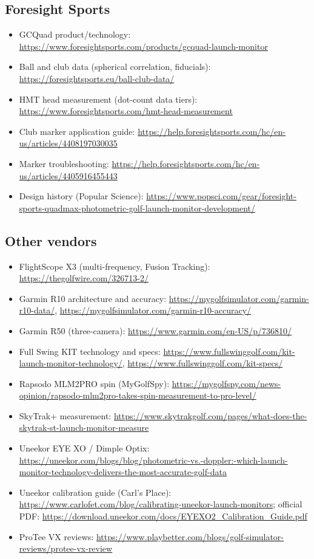 \subsection*{Foresight Sports}
\begin{itemize}\small
\item GCQuad product/technology:
  \url{https://www.foresightsports.com/products/gcquad-launch-monitor}
\item Ball and club data (spherical correlation, fiducials):
  \url{https://foresightsports.eu/ball-club-data/}
\item HMT head measurement (dot-count data tiers):
  \url{https://www.foresightsports.com/hmt-head-measurement}
\item Club marker application guide:
  \url{https://help.foresightsports.com/hc/en-us/articles/4408197030035}
\item Marker troubleshooting:
  \url{https://help.foresightsports.com/hc/en-us/articles/4405916455443}
\item Design history (Popular Science):
  \url{https://www.popsci.com/gear/foresight-sports-quadmax-photometric-golf-launch-monitor-development/}
\end{itemize}

\subsection*{Other vendors}
\begin{itemize}\small
\item FlightScope X3 (multi-frequency, Fusion Tracking):
  \url{https://thegolfwire.com/326713-2/}
\item Garmin R10 architecture and accuracy:
  \url{https://mygolfsimulator.com/garmin-r10-data/},
  \url{https://mygolfsimulator.com/garmin-r10-accuracy/}
\item Garmin R50 (three-camera):
  \url{https://www.garmin.com/en-US/p/736810/}
\item Full Swing KIT technology and specs:
  \url{https://www.fullswinggolf.com/kit-launch-monitor-technology/},
  \url{https://www.fullswinggolf.com/kit-specs/}
\item Rapsodo MLM2PRO spin (MyGolfSpy):
  \url{https://mygolfspy.com/news-opinion/rapsodo-mlm2pro-takes-spin-measurement-to-pro-level/}
\item SkyTrak+ measurement:
  \url{https://www.skytrakgolf.com/pages/what-does-the-skytrak-st-launch-monitor-measure}
\item Uneekor EYE XO / Dimple Optix:
  \url{https://uneekor.com/blogs/blog/photometric-vs.-doppler:-which-launch-monitor-technology-delivers-the-most-accurate-golf-data}
\item Uneekor calibration guide (Carl's Place):
  \url{https://www.carlofet.com/blog/calibrating-uneekor-launch-monitors};
  official PDF:
  \url{https://download.uneekor.com/docs/EYEXO2_Calibration_Guide.pdf}
\item ProTee VX reviews:
  \url{https://www.playbetter.com/blogs/golf-simulator-reviews/protee-vx-review}
\end{itemize}

